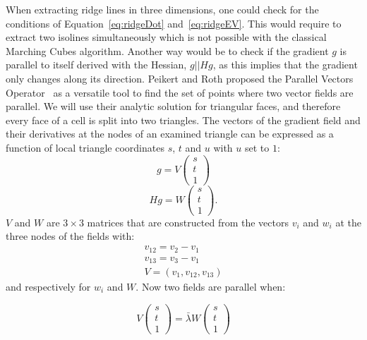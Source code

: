 When extracting ridge lines in three dimensions, one could check for the
conditions of Equation~\ref{eq:ridgeDot} and~\ref{eq:ridgeEV}. This
would require to extract two isolines simultaneously which is not
possible with the classical Marching Cubes algorithm. Another way would
be to check if the gradient $g$ is parallel to itself derived with the
Hessian, $g || H g$, as this implies that the gradient only changes
along its direction. Peikert and Roth proposed the Parallel Vectors
Operator~\cite{PV} as a versatile tool to find the set of points where
two vector fields are parallel. We will use their analytic solution for
triangular faces, and therefore every face of a cell is split into two
triangles. The vectors of the gradient field and their derivatives at
the nodes of an examined triangle can be expressed as a function of
local triangle coordinates $s$, $t$ and $u$ with $u$ set to $1$:
\begin{equation}
  g = V
  \begin{pmatrix}
    s\\
    t\\
    1
  \end{pmatrix}
\end{equation}
\begin{equation}
  H g = W
  \begin{pmatrix}
    s\\
    t\\
    1
  \end{pmatrix}.
\end{equation}
\noindent $V$ and $W$ are $3 \times 3$ matrices that are constructed
from the vectors $v_i$ and $w_i$ at the three nodes of the fields with:
\begin{align}
  v_{12} = v_2 - v_1\\
  v_{13} = v_3 - v_1\\
  V = (v_1, v_{12}, v_{13})
\end{align}
\noindent and respectively for $w_i$ and $W$. Now two fields are
parallel when:

\begin{equation}
  V
  \begin{pmatrix}
    s\\
    t\\
    1
  \end{pmatrix}
  = \bar{\lambda} W
  \begin{pmatrix}
    s\\
    t\\
    1
  \end{pmatrix}
\end{equation}

